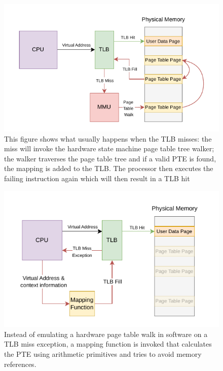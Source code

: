 \begin{figure}[ht!]
    \centering
    \includegraphics[scale=1.5]{figures/theory_normal_tlb_miss.pdf}
    \caption[Usual TLB miss]{This figure shows what usually happens when the TLB misses:
        the miss will invoke the hardware state machine page table tree walker; the walker traverses
        the page table tree and if a valid PTE is found, the mapping is added to the TLB. The processor
        then executes the failing instruction again which will then result in a TLB hit}
    \label{fig:theory:normal_tlb_miss}
\end{figure}
\begin{figure}[t]
    \centering
    \includegraphics[scale=1.5]{figures/theory_mapping_fx.pdf}
    \caption[Virtual Memory using a mapping function]{Instead of emulating a hardware page table walk in software on
        a TLB miss exception, a mapping function is invoked that calculates the PTE using arithmetic primitives and tries
        to avoid memory references.}
    \label{fig:theory:mapping_fx}
\end{figure}

